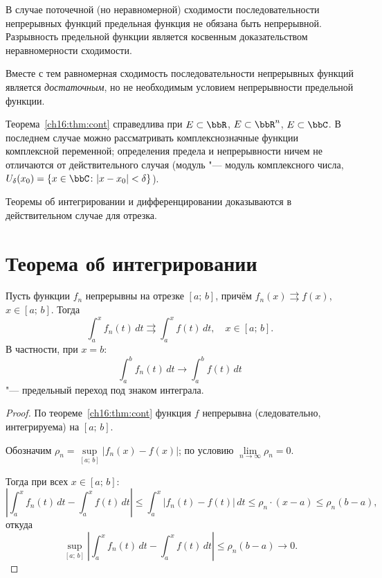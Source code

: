 \begin{notion}
В случае поточечной (но неравномерной) сходимости последовательности непрерывных функций предельная функция не обязана быть непрерывной. Разрывность предельной функции является косвенным доказательством неравномерности сходимости.

Вместе с тем равномерная сходимость последовательности непрерывных функций является \textit{достаточным}, но не необходимым условием непрерывности предельной функции.
\end{notion}

\begin{notion}
Теорема~\ref{ch16:thm:cont} справедлива при $E \subset \bbR$, $E \subset \bbR^n$, $E \subset \bbC$. В последнем случае можно рассматривать комплекснозначные функции комплексной переменной; определения предела и непрерывности ничем не отличаются от действительного случая (модуль "--- модуль комплексного числа, $U_\delta(x_0) = \{x \in \bbC \colon |x - x_0| < \delta\}$).

Теоремы об интегрировании и дифференцировании доказываются в действительном случае для отрезка.
\end{notion}

\section{Теорема об интегрировании}

\begin{thm} \label{ch16:thm:int}
Пусть функции $f_n$ непрерывны на отрезке $[a;\, b]$, причём $f_n(x) \rightrightarrows f(x)$, $x \in [a;\, b]$. Тогда
$$
\int_a^x f_n(t)\,dt \rightrightarrows \int_a^x f(t)\,dt, \quad x \in [a;\, b].
$$
В частности, при $x = b$:
$$
\int_a^b f_n(t)\,dt \to \int_a^b f(t)\,dt
$$
"--- предельный переход под знаком интеграла.
\end{thm}

\begin{proof}
По теореме~\ref{ch16:thm:cont} функция $f$ непрерывна (следовательно, интегрируема) на $[a;\, b]$.

Обозначим $\rho_n = \sup\limits_{[a;\, b]} |f_n(x) - f(x)|$; по условию $\lim\limits_{n \to \infty} \rho_n = 0$.

Тогда при всех $x \in [a;\, b]$:
$$
\left|\int_a^x f_n(t)\,dt - \int_a^x f(t)\,dt\right| \le \int_a^x |f_n(t) - f(t)|\,dt \le \rho_n \cdot (x - a) \le \rho_n(b - a),
$$
откуда
$$
\sup_{[a;\, b]} \left|\int_a^x f_n(t)\,dt - \int_a^x f(t)\,dt\right| \le \rho_n(b - a) \to 0.
$$
\end{proof}

